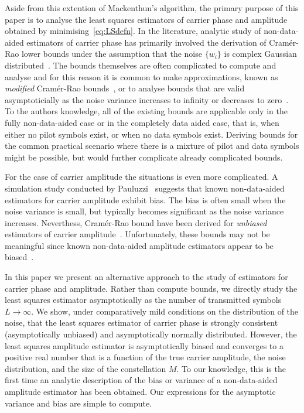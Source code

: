\documentclass[journal]{IEEEtran}
\begin{document}
Aside from this extention of Mackenthun's algorithm, the primary purpose of this paper is to analyse the least squares estimators of carrier phase and amplitude obtained by minimising~\eqref{eq:LSdefn}.  In the literature, analytic study of non-data-aided estimators of carrier phase has primarily involved the derivation of Cram\'{e}r-Rao lower bounds under the assumption that the noise $\{w_i\}$ is complex Gaussian distributed~\cite{Delmas_exact_crb_psk_2008,950345,Steendam_lowsnr_crb_2001,Cowley_crbs_phase_freq_1996,DAndrea_modified_bounds_1994}.  The bounds themselves are often complicated to compute and analyse and for this reason it is common to make approximations, known as \emph{modified} Cram\'{e}r-Rao bounds~\cite{DAndrea_modified_bounds_1994,Pollok_mckilliam_crb_cpm_2013}, or to analyse bounds that are valid asymptoticially as the noise variance increases to infinity or decreases to zero~\cite{Moeneclaey_limit_crbs_1998,Steendam_lowsnr_crb_2001,Delmas_exact_crb_psk_2008}.  To the authors knowledge, all of the existing bounds are applicable only in the fully non-data-aided case or in the completely data aided case, that is, when either no pilot symbols exist, or when no data symbols exist.  Deriving bounds for the common practical scenario where there is a mixture of pilot and data symbols might be possible, but would further complicate already complicated bounds.

For the case of carrier amplitude the situations is even more complicated.  A simulation study conducted by Pauluzzi~\cite{Pauluzzi2000} suggests that known non-data-aided estimators for carrier amplitude exhibit bias.  The bias is often small when the noise variance is small, but typically becomes significant as the noise variance increases.  Neverthess, Cram\'{e}r-Rao bound have been derived for \emph{unbiased} estimators of carrier amplitude~\cite{Alagha_crb_snr_bpsk_qpsk_2001,Delmas_exact_crb_psk_2008}.  Unfortunately, these bounds may not be meaningful since known non-data-aided amplitude estimators appear to be biased~\cite{Pauluzzi2000}. 

In this paper we present an alternative approach to the study of estimators for carrier phase and amplitude.  Rather than compute bounds, we directly study the least squares estimator asymptotically as the number of transmitted symbols $L\to \infty$.  We show, under comparatively mild conditions on the distribution of the noise, that the least squares estimator of carrier phase is strongly consistent (asymptotically unbiased) and asymptotically normally distributed.  However, the least squares amplitude estimator is asymptotically biased and converges to a positive real number that is a function of the true carrier amplitude, the noise distribution, and the size of the constellation $M$.  To our knowledge, this is the first time an analytic description of the bias or variance of a non-data-aided amplitude estimator has been obtained.  Our expressions for the asymptotic variance and bias are simple to compute.  %
\end{document}
